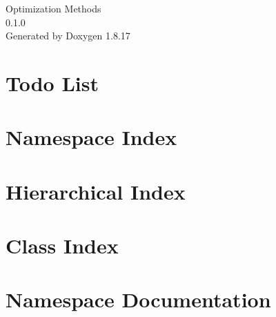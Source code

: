 \let\mypdfximage\pdfximage\def\pdfximage{\immediate\mypdfximage}\documentclass[twoside]{book}
\newcommand{\+}{\discretionary{\mbox{\scriptsize$\hookleftarrow$}}{}{}}
\newcommand{\clearemptydoublepage}{%
  \newpage{\pagestyle{empty}\cleardoublepage}%
}
\begin{document}
\hypersetup{pageanchor=false,
             bookmarksnumbered=true,
             pdfencoding=unicode
            }
\begin{titlepage}
\vspace*{7cm}
\begin{center}%
{\Large Optimization Methods \\[1ex]\large 0.\+1.\+0 }\\
\vspace*{1cm}
{\large Generated by Doxygen 1.8.17}\\
\end{center}
\end{titlepage}
\clearemptydoublepage
{}
\tableofcontents
\clearemptydoublepage
{}
\hypersetup{pageanchor=true}

\chapter{Todo List}
\label{todo}

\chapter{Namespace Index}

\chapter{Hierarchical Index}

\chapter{Class Index}

\chapter{Namespace Documentation}














\end{document}
